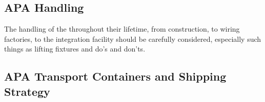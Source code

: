 \subsection{APA Handling}
\label{sec:fdsp-apa-transport-handling}


The handling of the  throughout their lifetime, from construction, to wiring factories, to the integration facility should be carefully considered, especially such things as lifting fixtures and do's  and don'ts.  





\subsection{APA Transport Containers and Shipping Strategy}
\label{sec:fdsp-apa-transport-container}

